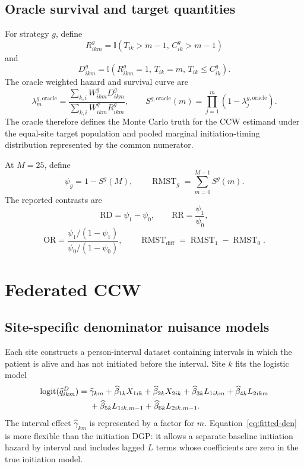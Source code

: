 \documentclass[11pt]{article}
\newcommand{\ind}{\mathbb{I}}
\newcommand{\RMST}{\operatorname{RMST}}
\begin{document}
\subsection{Oracle survival and target quantities}

For strategy $g$, define
\[
  R^g_{ikm}
  =\ind(T_{ik}>m-1,\,C^g_{ik}>m-1)
\]
and
\[
  D^g_{ikm}
  =\ind(R^g_{ikm}=1,\,T_{ik}=m,\,T_{ik}\leq C^g_{ik}).
\]
The oracle weighted hazard and survival curve are
\[
  \lambda^{g,\mathrm{oracle}}_m
  =\frac{\sum_{k,i}W^g_{ikm}D^g_{ikm}}
         {\sum_{k,i}W^g_{ikm}R^g_{ikm}},
  \qquad
  S^{g,\mathrm{oracle}}(m)
  =\prod_{j=1}^m\left(1-\lambda^{g,\mathrm{oracle}}_j\right).
\]
The oracle therefore defines the Monte Carlo truth for the CCW estimand under
the equal-site target population and pooled marginal initiation-timing
distribution represented by the common numerator.

At $M=25$, define
\[
  \psi_g=1-S^g(M),
  \qquad
  \RMST_g=\sum_{m=0}^{M-1}S^g(m).
\]
The reported contrasts are
\[
  \mathrm{RD}=\psi_1-\psi_0,
  \qquad
  \mathrm{RR}=\frac{\psi_1}{\psi_0},
\]
\[
  \mathrm{OR}
  =\frac{\psi_1/(1-\psi_1)}{\psi_0/(1-\psi_0)},
  \qquad
  \RMST_{\mathrm{diff}}=\RMST_1-\RMST_0.
\]

\section{Federated CCW}

\subsection{Site-specific denominator nuisance models}

Each site constructs a person-interval dataset containing intervals in which
the patient is alive and has not initiated before the interval. Site $k$ fits
the logistic model
\begin{align}
\label{eq:fitted-den}
  \operatorname{logit}(\widehat q^D_{ikm})
  ={}&\widehat\gamma_{km}
      +\widehat\beta_{1k}X_{1ik}
      +\widehat\beta_{2k}X_{2ik}
      +\widehat\beta_{3k}L_{1ikm}
      +\widehat\beta_{4k}L_{2ikm} \notag\\
     &+\widehat\beta_{5k}L_{1ik,m-1}
      +\widehat\beta_{6k}L_{2ik,m-1}.
\end{align}
The interval effect $\widehat\gamma_{km}$ is represented by a factor for
$m$. Equation~\eqref{eq:fitted-den} is more flexible than the initiation DGP:
it allows a separate baseline initiation hazard by interval and includes
lagged $L$ terms whose coefficients are zero in the true initiation model.
\end{document}
